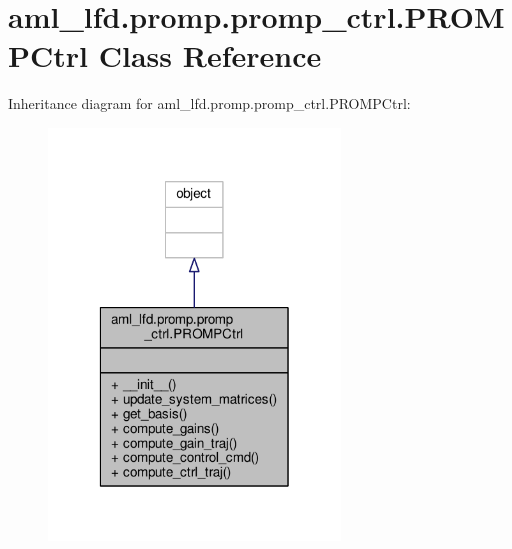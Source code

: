 \hypertarget{classaml__lfd_1_1promp_1_1promp__ctrl_1_1_p_r_o_m_p_ctrl}{\section{aml\-\_\-lfd.\-promp.\-promp\-\_\-ctrl.\-P\-R\-O\-M\-P\-Ctrl Class Reference}
\label{classaml__lfd_1_1promp_1_1promp__ctrl_1_1_p_r_o_m_p_ctrl}
}


Inheritance diagram for aml\-\_\-lfd.\-promp.\-promp\-\_\-ctrl.\-P\-R\-O\-M\-P\-Ctrl\-:\nopagebreak
\begin{figure}[H]
\begin{center}
\leavevmode
\includegraphics[width=220pt]{classaml__lfd_1_1promp_1_1promp__ctrl_1_1_p_r_o_m_p_ctrl__inherit__graph}
\end{center}
\end{figure}


